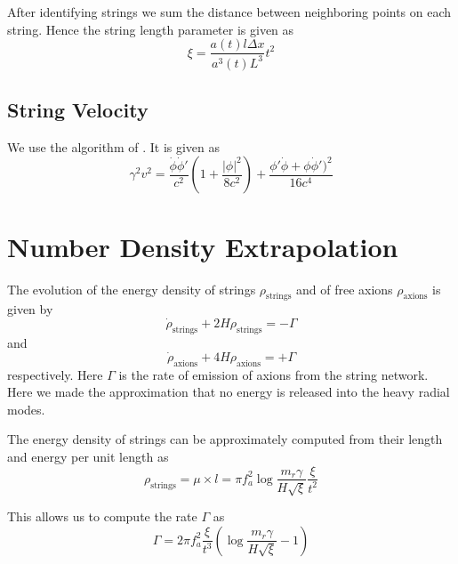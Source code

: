 \documentclass[a4paper]{article}
\begin{document}
After identifying strings we sum the distance between neighboring points on each string. Hence the string length parameter is given as 
\begin{equation}
	\xi = \frac{a(t) l \Delta x}{a^3(t) L^3} t^2
\end{equation}

\subsection{String Velocity}
We use the algorithm of \cite[appendix A.2, eq. A.10]{axion_dark_matter_strings_and_their_cores}.
It is given as
\begin{equation}
	\gamma^2 v^2 = \frac{\dot{\phi} \dot{\phi}'}{c^2} \left(1 + \frac{|\phi|^2}{8 c^2} \right) + \frac{\phi' \dot{\phi} + \phi \dot{\phi}')^2}{16 c^4}
\end{equation}

\newpage
\section{Number Density Extrapolation}

The evolution of the energy density of strings $\rho_\mathrm{strings}$
and of free axions $\rho_\mathrm{axions}$ is given by
\begin{equation}
	\label{eq:string_energy_eom}
	\dot{\rho}_\mathrm{strings} + 2 H \rho_\mathrm{strings} = - \Gamma
\end{equation}
and
\begin{equation}
	\label{eq:axion_energy_eom}
	\dot{\rho}_\mathrm{axions} + 4 H \rho_\mathrm{axions} = + \Gamma
\end{equation}
respectively.
Here $\Gamma$ is the rate of emission of axions from the string network.
Here we made the approximation that no energy is released into the heavy radial modes. 

The energy density of strings can be approximately computed from their length and energy per unit length as
\begin{equation}
	\rho_\mathrm{strings} = \mu \times l = \pi f_a^2 \log \frac{m_r \gamma}{H \sqrt{\xi}} \frac{\xi}{t^2}
\end{equation}

This allows us to compute the rate $\Gamma$ as 
\begin{equation}
	\Gamma = 2 \pi f_a^2 \frac{\xi}{t^3} \left( \log \frac{m_r \gamma}{H \sqrt{\xi}} - 1  \right)
\end{equation}
\end{document}
